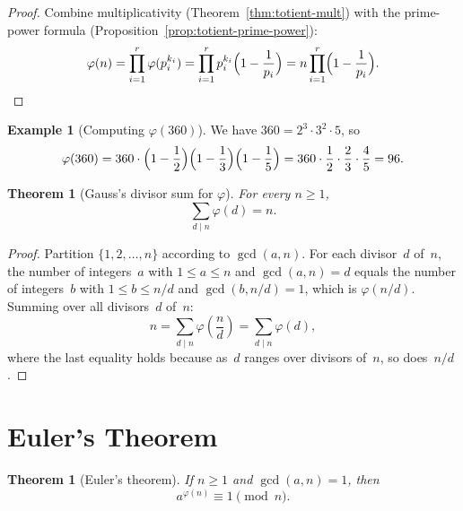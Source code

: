 \documentclass[12pt,a4paper,openany]{book}
\theoremstyle{definition}
\newtheorem{example}[definition]{Example}
\theoremstyle{plain}
\newtheorem{theorem}[definition]{Theorem}
\theoremstyle{remark}
\begin{document}
\begin{proof}
Combine multiplicativity (Theorem~\ref{thm:totient-mult}) with the
prime-power formula (Proposition~\ref{prop:totient-prime-power}):
\[
  \varphi(n)
  = \prod_{i=1}^{r} \varphi(p_i^{k_i})
  = \prod_{i=1}^{r} p_i^{k_i}\Bigl(1 - \frac{1}{p_i}\Bigr)
  = n \prod_{i=1}^{r} \Bigl(1 - \frac{1}{p_i}\Bigr).
  \qedhere
\]
\end{proof}

\begin{example}[Computing $\varphi(360)$]
\label{ex:totient-360}
We have $360 = 2^3 \cdot 3^2 \cdot 5$, so
\[
  \varphi(360) = 360 \cdot \Bigl(1 - \frac{1}{2}\Bigr)
                      \Bigl(1 - \frac{1}{3}\Bigr)
                      \Bigl(1 - \frac{1}{5}\Bigr)
               = 360 \cdot \frac{1}{2} \cdot \frac{2}{3} \cdot \frac{4}{5}
               = 96.
\]
\end{example}

\begin{theorem}[Gauss's divisor sum for $\varphi$]
\label{thm:gauss-divisor-sum}
For every $n \ge 1$,
\[
  \sum_{d \mid n} \varphi(d) = n.
\]
\end{theorem}

\begin{proof}
Partition $\{1, 2, \dots, n\}$ according to $\gcd(a, n)$.  For each
divisor~$d$ of~$n$, the number of integers~$a$ with $1 \le a \le n$ and
$\gcd(a,n) = d$ equals the number of integers~$b$ with $1 \le b \le n/d$
and $\gcd(b, n/d) = 1$, which is $\varphi(n/d)$.  Summing over all
divisors~$d$ of~$n$:
\[
  n = \sum_{d \mid n} \varphi\!\left(\frac{n}{d}\right)
    = \sum_{d \mid n} \varphi(d),
\]
where the last equality holds because as~$d$ ranges over divisors of~$n$,
so does~$n/d$.
\end{proof}

\section{Euler's Theorem}
\label{sec:euler-thm}

\begin{theorem}[Euler's theorem]
\label{thm:euler}
If $n \ge 1$ and $\gcd(a,n) = 1$, then
\[
  a^{\varphi(n)} \equiv 1 \pmod{n}.
\]
\end{theorem}
\end{document}
